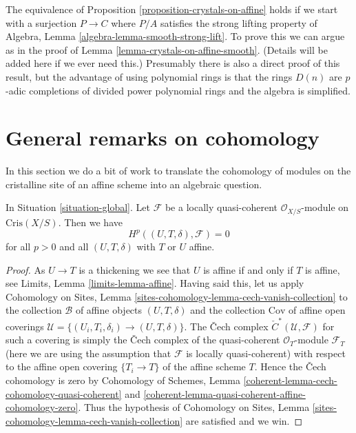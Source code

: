 \begin{remark}
\label{remark-equivalence-more-general}
The equivalence of Proposition \ref{proposition-crystals-on-affine}
holds if we start with a surjection $P \to C$ where $P/A$ satisfies the
strong lifting property of
Algebra, Lemma \ref{algebra-lemma-smooth-strong-lift}.
To prove this we can argue as in the proof of
Lemma \ref{lemma-crystals-on-affine-smooth}.
(Details will be added here if we ever need this.)
Presumably there is also a direct proof of this result, but the advantage
of using polynomial rings is that the rings $D(n)$ are $p$-adic completions
of divided power polynomial rings and the algebra is simplified.
\end{remark}



\section{General remarks on cohomology}
\label{section-cohomology-lqc}

\noindent
In this section we do a bit of work to translate the cohomology
of modules on the cristalline site of an affine scheme into
an algebraic question.

\begin{lemma}
\label{lemma-vanishing-lqc}
In Situation \ref{situation-global}.
Let $\mathcal{F}$ be a locally quasi-coherent $\mathcal{O}_{X/S}$-module
on $\text{Cris}(X/S)$. Then we have
$$
H^p((U, T, \delta), \mathcal{F}) = 0
$$
for all $p > 0$ and all $(U, T, \delta)$ with $T$ or $U$ affine.
\end{lemma}

\begin{proof}
As $U \to T$ is a thickening we see that $U$ is affine if and only if $T$
is affine, see Limits, Lemma \ref{limits-lemma-affine}.
Having said this, let us apply
Cohomology on Sites, Lemma \ref{sites-cohomology-lemma-cech-vanish-collection}
to the collection $\mathcal{B}$ of affine objects $(U, T, \delta)$ and the
collection $\text{Cov}$ of affine open coverings
$\mathcal{U} = \{(U_i, T_i, \delta_i) \to (U, T, \delta)\}$. The
{\v C}ech complex
${\check C}^*(\mathcal{U}, \mathcal{F})$ for such a covering is simply
the {\v C}ech complex of the quasi-coherent $\mathcal{O}_T$-module
$\mathcal{F}_T$
(here we are using the assumption that $\mathcal{F}$ is locally quasi-coherent)
with respect to the affine open covering $\{T_i \to T\}$ of the
affine scheme $T$. Hence the {\v C}ech cohomology is zero by
Cohomology of Schemes, Lemma
\ref{coherent-lemma-cech-cohomology-quasi-coherent} and
\ref{coherent-lemma-quasi-coherent-affine-cohomology-zero}.
Thus the hypothesis of
Cohomology on Sites, Lemma \ref{sites-cohomology-lemma-cech-vanish-collection}
are satisfied and we win.
\end{proof}

